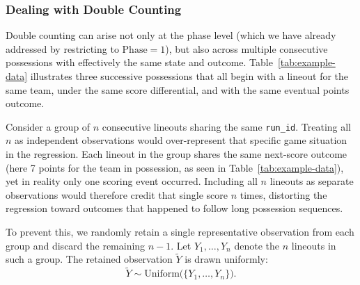 \documentclass[12pt]{article}
\begin{document}
\subsubsection{Dealing with Double Counting}

Double counting can arise not only at the phase level (which we have already addressed by restricting to $\text{Phase} = 1$), but also across multiple consecutive possessions with effectively the same state and outcome. Table~\ref{tab:example-data} illustrates three successive possessions that all begin with a lineout for the same team, under the same score differential, and with the same eventual points outcome.

\begin{table}[H]
\centering
\caption{Multiple possessions with the same outcome following consecutive lineouts}
\label{tab:example-data}
\end{table}

Consider a group of $n$ consecutive lineouts sharing the same \texttt{run\_id}. Treating all $n$ as independent observations would over-represent that specific game situation in the regression. Each lineout in the group shares the same next-score outcome (here 7 points for the team in possession, as seen in Table~\ref{tab:example-data}), yet in reality only one scoring event occurred. Including all $n$ lineouts as separate observations would therefore credit that single score $n$ times, distorting the regression toward outcomes that happened to follow long possession sequences.


To prevent this, we randomly retain a single representative observation from each group and discard the remaining $n-1$. Let $Y_1, \dots, Y_n$ denote the $n$ lineouts in such a group. The retained observation $\tilde{Y}$ is drawn uniformly:
\[
\tilde{Y} \sim \text{Uniform}\big(\{Y_1, \dots, Y_n\}\big).
\]
\end{document}
